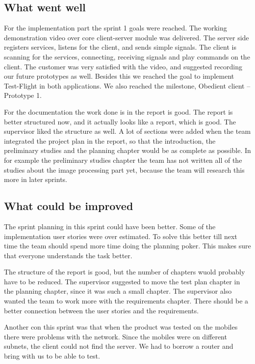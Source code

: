 \subsection{What went well}
For the implementation part the sprint 1 goals were reached. The working demonstration video over core client-server module was delivered. The server side registers services, listens for the client, and sends simple  signals. The client is scanning for the services, connecting, receiving signals and play commands on the client. The customer was very satisfied with the video, and suggested recording our future prototypes as well. Besides this we reached the goal to implement Test-Flight in both applications. We also reached the milestone, Obedient client -- Prototype 1.

For the documentation the work done is in the report is good. The report is better structured now, and it actually looks like a report, which is good. The supervisor liked the structure as well. A lot of sections were added when the team integrated the project plan in the report, so that the introduction, the preliminary studies and the planning chapter would be as complete as possible. In for example the preliminary studies chapter the team has not written all of the studies about the image processing part yet, because the team will research this more in later sprints.

\subsection{What could be improved}
The sprint planning in this sprint could have been better. Some of the implementation user stories were over estimated. To solve this better till next time the team should spend more time doing the planning poker. This makes sure that everyone understands the task better. 

The structure of the report is good, but the number of chapters wuold probably have to be reduced. The supervisor suggested to move the test plan chapter in the planning chapter, since it was such a small chapter. The supervisor also wanted the team to work more with the requirements chapter. There should be a better connection between the user stories and the requirements.


Another con this sprint was that when the product was tested on the mobiles there were problems with the network. Since the mobiles were on different subnets, the client could not find the server. We had to borrow a router and bring with us to be able to test. 

